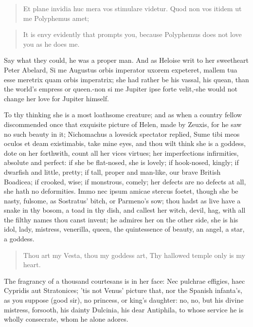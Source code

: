 \begin{latin}
\begin{verse}
Et plane invidia huc mera vos stimulare videtur.
Quod non vos itidem ut me Polyphemus amet;
\end{verse}
\end{latin}
\translationrule%
\begin{verse}%
It is envy evidently that prompts you,
because Polyphemus does not love you as he does me.
\end{verse}%

Say what they could, he was a proper man. And as Heloise writ to her
sweetheart Peter Abelard, Si me Augustus orbis imperator uxorem
expeteret, mallem tua esse meretrix quam orbis imperatrix; she had
rather be his vassal, his quean, than the world's empress or queen.-non
si me Jupiter ipse forte velit,-she would not change her love for
Jupiter himself.

To thy thinking she is a most loathsome creature; and as when a country
fellow discommended once that exquisite picture of Helen, made by
Zeuxis, for he saw no such beauty in it; Nichomachus a lovesick
spectator replied, Sume tibi meos oculos et deam existimabis, take mine
eyes, and thou wilt think she is a goddess, dote on her forthwith,
count all her vices virtues; her imperfections infirmities, absolute
and perfect: if she be flat-nosed, she is lovely; if hook-nosed,
kingly; if dwarfish and little, pretty; if tall, proper and man-like,
our brave British Boadicea; if crooked, wise; if monstrous, comely; her
defects are no defects at all, she hath no deformities. Immo nec ipsum
amicae stercus foetet, though she be nasty, fulsome, as Sostratus'
bitch, or Parmeno's sow; thou hadst as live have a snake in thy bosom,
a toad in thy dish, and callest her witch, devil, hag, with all the
filthy names thou canst invent; he admires her on the other side, she
is his idol, lady, mistress, venerilla, queen, the quintessence
of beauty, an angel, a star, a goddess.

\begin{verse}%
Thou art my Vesta, thou my goddess art,
Thy hallowed temple only is my heart.
\end{verse}%

The fragrancy of a thousand courtesans is in her face: Nec
pulchrae effigies, haec Cypridis aut Stratonices; 'tis not Venus'
picture that, nor the Spanish infanta's, as you suppose (good sir), no
princess, or king's daughter: no, no, but his divine mistress,
forsooth, his dainty Dulcinia, his dear Antiphila, to whose service he
is wholly consecrate, whom he alone adores.

